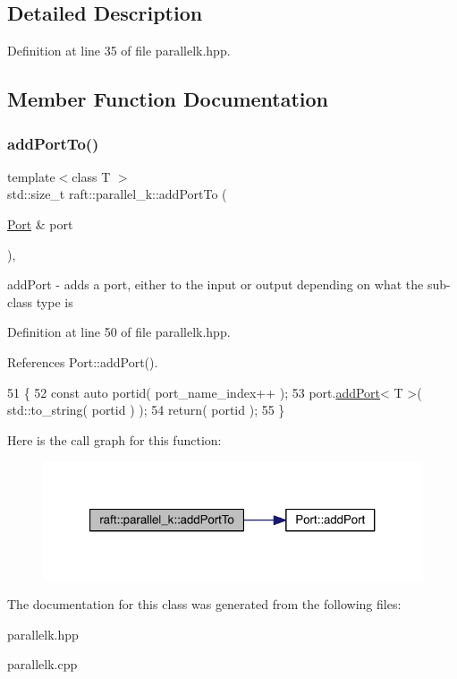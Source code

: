 \subsection{Detailed Description}


Definition at line 35 of file parallelk.\+hpp.



\subsection{Member Function Documentation}
\hypertarget{classraft_1_1parallel__k_a73b5ea02ddaf42293de155d0f256c854}{}\label{classraft_1_1parallel__k_a73b5ea02ddaf42293de155d0f256c854} 
\subsubsection{\texorpdfstring{add\+Port\+To()}{addPortTo()}}
{\footnotesize\ttfamily template$<$class T $>$ \\
std\+::size\+\_\+t raft\+::parallel\+\_\+k\+::add\+Port\+To (\begin{DoxyParamCaption}\item[{\hyperlink{class_port}{Port} \&}]{port }\end{DoxyParamCaption})\hspace{0.3cm}{\ttfamily [inline]}, {\ttfamily [protected]}}

add\+Port -\/ adds a port, either to the input or output depending on what the sub-\/class type is 

Definition at line 50 of file parallelk.\+hpp.



References Port\+::add\+Port().


\begin{DoxyCode}
51    \{
52       \textcolor{keyword}{const} \textcolor{keyword}{auto} portid( port\_name\_index++ );
53       port.\hyperlink{class_port_a9c1343a48c523fc5b285cb055ba2b53e}{addPort}< T >( std::to\_string( portid ) );
54       \textcolor{keywordflow}{return}( portid );
55    \}
\end{DoxyCode}
Here is the call graph for this function\+:
\nopagebreak
\begin{figure}[H]
\begin{center}
\leavevmode
\includegraphics[width=321pt]{classraft_1_1parallel__k_a73b5ea02ddaf42293de155d0f256c854_cgraph}
\end{center}
\end{figure}


The documentation for this class was generated from the following files\+:\begin{DoxyCompactItemize}
\item 
parallelk.\+hpp\item 
parallelk.\+cpp\end{DoxyCompactItemize}
